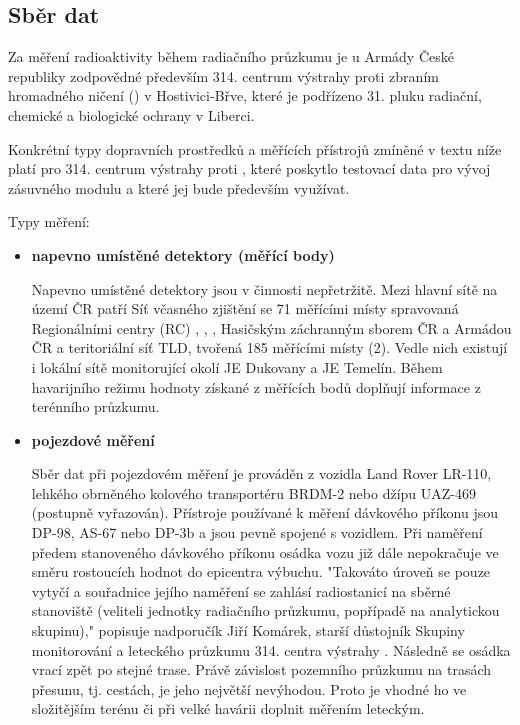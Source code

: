 \subsection{Sběr dat}

Za měření radioaktivity během radiačního průzkumu je u Armády České republiky zodpovědné především 314. centrum výstrahy proti zbraním hromadného ničení () v Hostivici-Břve, které je podřízeno 31. pluku radiační, chemické a biologické ochrany v Liberci. 
 
	Konkrétní typy dopravních prostředků a měřících přístrojů zmíněné v textu níže platí pro 314. centrum výstrahy proti , které poskytlo testovací data pro vývoj zásuvného modulu a které jej bude především využívat. 

Typy měření:
\begin{itemize}
	\item \textbf{napevno umístěné detektory (měřící body)}
	
	Napevno umístěné detektory jsou v činnosti nepřetržitě. Mezi hlavní sítě na území ČR patří Síť včasného zjištění se 71 měřícími místy spravovaná Regionálními centry (RC) , , , Hasičským záchranným sborem ČR a Armádou ČR a teritoriální síť TLD, tvořená 185 měřícími místy (2). Vedle nich existují i lokální sítě monitorující okolí JE Dukovany a JE Temelín.
	Během havarijního režimu hodnoty získané z měřících bodů doplňují informace z terénního průzkumu. 
	
	
	\item \textbf{pojezdové měření}
	
	Sběr dat při pojezdovém měření je prováděn z vozidla Land Rover LR-110, lehkého obrněného kolového transportéru BRDM-2 nebo džípu UAZ-469 (postupně vyřazován). Přístroje používané k měření dávkového příkonu jsou DP-98, AS-67 nebo DP-3b a jsou pevně spojené s vozidlem. 
	Při naměření předem stanoveného dávkového příkonu osádka vozu již dále nepokračuje ve směru rostoucích hodnot do epicentra výbuchu. "Takováto úroveň se pouze vytyčí a souřadnice jejího naměření se zahlásí radiostanicí na sběrné stanoviště (veliteli jednotky radiačního průzkumu, popřípadě na analytickou skupinu)," popisuje nadporučík Jiří Komárek, starší důstojník Skupiny monitorování a leteckého průzkumu 314. centra výstrahy . Následně se osádka vrací zpět po stejné trase. 
	Právě závislost pozemního průzkumu na trasách přesunu, tj. cestách, je jeho největší nevýhodou. Proto je vhodné ho ve složitějším terénu či při velké havárii doplnit měřením leteckým.
	

\end{itemize}
